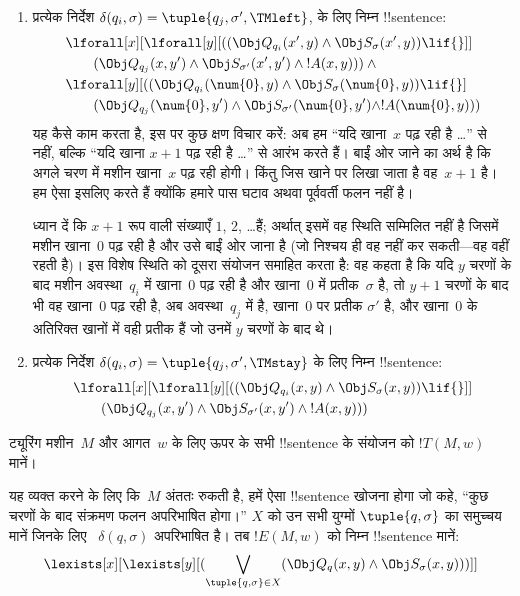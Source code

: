 \documentclass[../../../include/open-logic-section]{subfiles}
\begin{document}
\begin{enumerate}
\begin{enumerate}
\item {} प्रत्येक निर्देश $\delta(q_i, \sigma) =
  \tuple{q_j, \sigma', \TMleft}$, के लिए निम्न !!{sentence}:
\begin{align*}
& \lforall[x][\lforall[y][
    ((\Obj Q_{q_i}(x', y) \land \Obj S_{\sigma}(x', y)) \lif {}]]\\
& \qquad   (\Obj Q_{q_j}(x, y') \land \Obj S_{\sigma'}(x', y') \land
{}!A(x, y))) \land {}\\
& \lforall[y][((\Obj Q_{q_i}(\num{0}, y) \land \Obj S_{\sigma}(\num{0},
    y)) \lif {}]\\
& \qquad (\Obj Q_{q_j}(\num{0}, y') \land \Obj S_{\sigma'}(\num{0},
  y') \land !A(\num{0}, y)))
\end{align*}
यह कैसे काम करता है, इस पर कुछ क्षण विचार करें: अब हम ``यदि खाना~$x$
पढ़ रही है \dots'' से नहीं, बल्कि ``यदि खाना $x+1$ पढ़ रही है \dots''
से आरंभ करते हैं। बाईं ओर जाने का अर्थ है कि अगले चरण में मशीन खाना~$x$
पढ़ रही होगी। किंतु जिस खाने पर लिखा जाता है वह~$x+1$ है। हम ऐसा इसलिए
करते हैं क्योंकि हमारे पास घटाव अथवा पूर्ववर्ती फलन नहीं है।

ध्यान दें कि $x+1$ रूप वाली संख्याएँ $1$, $2$, \dots हैं; अर्थात् इसमें
वह स्थिति सम्मिलित नहीं है जिसमें मशीन खाना~$0$ पढ़ रही है और उसे बाईं
ओर जाना है (जो निश्चय ही वह नहीं कर सकती---वह वहीं रहती है)। इस विशेष
स्थिति को दूसरा संयोजन समाहित करता है: वह कहता है कि यदि $y$ चरणों के
बाद मशीन अवस्था~$q_i$ में खाना~$0$ पढ़ रही है और खाना~$0$ में
प्रतीक~$\sigma$ है, तो $y+1$ चरणों के बाद भी वह खाना~$0$ पढ़ रही है,
अब अवस्था~$q_j$ में है, खाना~$0$ पर प्रतीक $\sigma'$ है, और खाना~$0$ के
अतिरिक्त खानों में वही प्रतीक हैं जो उनमें $y$ चरणों के बाद थे।
\item {} प्रत्येक निर्देश $\delta(q_i, \sigma) =
  \tuple{q_j, \sigma', \TMstay}$ के लिए निम्न !!{sentence}:
\begin{align*}
& \lforall[x][\lforall[y][(
   (\Obj Q_{q_i}(x, y) \land \Obj S_{\sigma}(x, y)) \lif {}]] \\
&\qquad   (\Obj Q_{q_j}(x, y') \land \Obj S_{\sigma'}(x, y') \land
{}!A(x, y)))
\end{align*}
\end{enumerate}
\end{enumerate}
ट्यूरिंग मशीन~$M$ और आगत~$w$ के लिए ऊपर के सभी !!{sentence} के संयोजन
को $!T(M, w)$ मानें।

यह व्यक्त करने के लिए कि~$M$ अंततः रुकती है, हमें ऐसा !!{sentence} खोजना
होगा जो कहे, ``कुछ चरणों के बाद संक्रमण फलन अपरिभाषित होगा।'' $X$ को
उन सभी युग्मों $\tuple{q, \sigma}$ का समुच्चय मानें जिनके लिए
~$\delta(q, \sigma)$ अपरिभाषित है। तब $!E(M, w)$ को निम्न !!{sentence}
मानें:
\[
\lexists[x][\lexists[y][(\bigvee_{\tuple{q, \sigma} \in
      X}(\Obj Q_q(x, y) \land \Obj S_\sigma(x, y)))]]
\]
\end{document}
